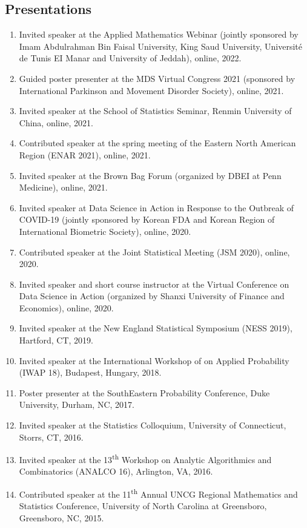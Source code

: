 \documentclass{res}
\begin{document}
\begin{resume}
\section{Presentations}
\begin{enumerate}
	\item Invited speaker at the Applied Mathematics Webinar 
	(jointly sponsored by Imam Abdulrahman Bin Faisal University, 
	King Saud University, Universit\'{e} de Tunis EI Manar and 
	University of Jeddah), online, 2022.
	\item Guided poster presenter at the MDS Virtual Congress 2021 
	(sponsored by International Parkinson and Movement Disorder 
	Society), online, 2021.
	\item Invited speaker at the School of Statistics Seminar, 
	Renmin University of China, online, 2021.
	\item Contributed speaker at the spring meeting of the Eastern 
	North American Region (ENAR 2021), online, 2021.
	\item Invited speaker at the Brown Bag Forum (organized by DBEI 
	at Penn Medicine), online, 2021.
	\item Invited speaker at Data Science in Action in Response to 
	the Outbreak of COVID-19 (jointly sponsored by Korean FDA and 
	Korean Region of International Biometric Society), online, 2020.
	\item Contributed speaker at the Joint Statistical Meeting (JSM 
	2020), 
	online, 2020.
	\item Invited speaker and short course instructor at the Virtual 
	Conference on Data Science in Action (organized by Shanxi 
	University of Finance and Economics), online, 2020.
	\item Invited speaker at the New England Statistical Symposium (NESS 2019), Hartford, CT, 2019.
	\item Invited speaker at the International Workshop of on Applied Probability (IWAP 18), Budapest, Hungary, 2018.
	\item Poster presenter at the SouthEastern Probability Conference, Duke University, Durham, NC, 2017.
	\item Invited speaker at the Statistics Colloquium, University of Connecticut, Storrs, CT, 2016.
	\item Invited speaker at the 13\textsuperscript{th} Workshop on Analytic Algorithmics and Combinatorics (ANALCO 16), Arlington, VA, 2016.
	\item Contributed speaker at the 11\textsuperscript{th} Annual UNCG Regional Mathematics and Statistics Conference, University of North Carolina at Greensboro, Greensboro, NC, 2015.

\end{enumerate}
\end{resume}
\end{document}
